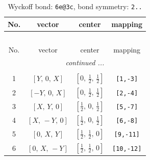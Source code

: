 \documentclass[fleqn,8pt]{jsarticle}
\begin{document}
\renewcommand{\arraystretch}{1.2}
\begin{longtable}{cccc}
\caption{Wyckoff bond: {\tt 6e@3c}, bond symmetry: {\tt 2..}}
 \\
 \hline \hline
No. & vector & center & mapping \\ \hline \endfirsthead

\multicolumn{3}{l}{\tablename\ \thetable{}} \\
 \hline \hline
No. & vector & center & mapping \\ \hline \endhead

 \hline \hline
\multicolumn{3}{r}{\footnotesize\it continued ...} \\ \endfoot

 \hline \hline
\multicolumn{3}{r}{} \\ \endlastfoot

1 & $\left[ Y,\, 0,\, X \right]$ & $\left[ 0,\, \frac{1}{2},\, \frac{1}{2} \right]$ & {\tt [1,-3]} \\ \hline
2 & $\left[ - Y,\, 0,\, X \right]$ & $\left[ 0,\, \frac{1}{2},\, \frac{1}{2} \right]$ & {\tt [2,-4]} \\ \hline
3 & $\left[ X,\, Y,\, 0 \right]$ & $\left[ \frac{1}{2},\, 0,\, \frac{1}{2} \right]$ & {\tt [5,-7]} \\ \hline
4 & $\left[ X,\, - Y,\, 0 \right]$ & $\left[ \frac{1}{2},\, 0,\, \frac{1}{2} \right]$ & {\tt [6,-8]} \\ \hline
5 & $\left[ 0,\, X,\, Y \right]$ & $\left[ \frac{1}{2},\, \frac{1}{2},\, 0 \right]$ & {\tt [9,-11]} \\ \hline
6 & $\left[ 0,\, X,\, - Y \right]$ & $\left[ \frac{1}{2},\, \frac{1}{2},\, 0 \right]$ & {\tt [10,-12]} \\
\end{longtable}
\renewcommand{\arraystretch}{1.2}
\end{document}
